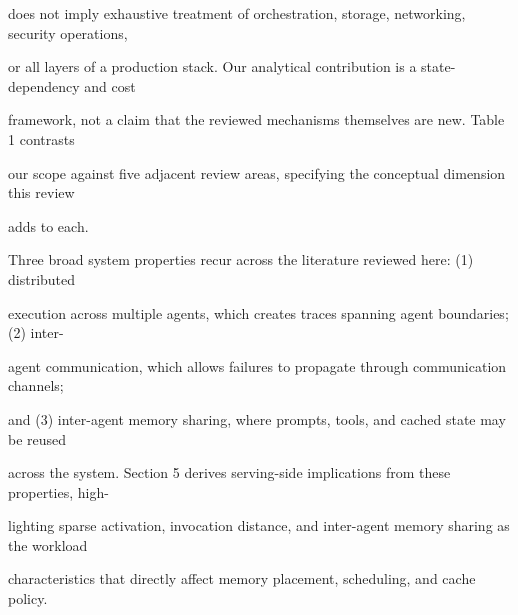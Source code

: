 \begin{flushleft}
\noindent does not imply exhaustive treatment of orchestration, storage, networking, security operations,\par
\noindent or all layers of a production stack. Our analytical contribution is a state-dependency and cost\par
\noindent framework, not a claim that the reviewed mechanisms themselves are new. Table 1 contrasts\par
\noindent our scope against five adjacent review areas, specifying the conceptual dimension this review\par
\noindent adds to each.\par
\noindent  Three broad system properties recur across the literature reviewed here: (1) distributed\par
\noindent execution across multiple agents, which creates traces spanning agent boundaries; (2) inter-\par
\noindent agent communication, which allows failures to propagate through communication channels;\par
\noindent and (3) inter-agent memory sharing, where prompts, tools, and cached state may be reused\par
\noindent across the system. Section 5 derives serving-side implications from these properties, high-\par
\noindent lighting sparse activation, invocation distance, and inter-agent memory sharing as the workload\par
\noindent characteristics that directly affect memory placement, scheduling, and cache policy.\par
\end{flushleft}
